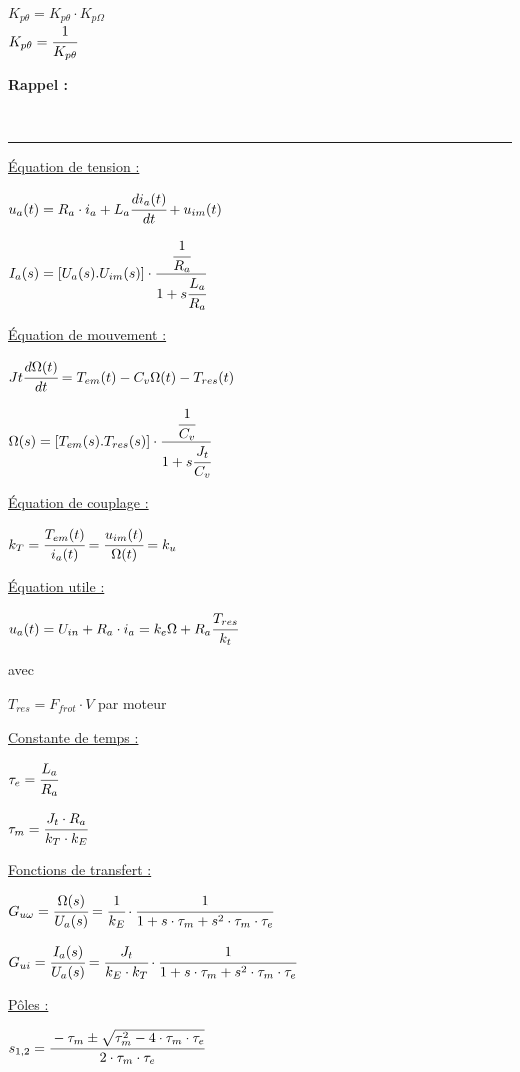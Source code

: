 \documentclass[	DIV=calc,%
							paper=a4,%
							fontsize=10pt,%
							twocolumn]{scrartcl} %
\newcounter{mycounter}
\newcommand{\formdesc}[1]{\large\textbf{#1} \addtocounter{mycounter}{1} \hfill \themycounter \\ \vspace{-3mm} \hrule \vspace{2mm}}
\newcommand{\formtitle}[1]{\large\underline{#1}}
\begin{document}
$K_{p\theta} =  K_{p\theta} \cdot K_{p\Omega}$\\


$K_{p\theta} =  \cfrac{1}{K_{p\theta}}$


\newpage

\formdesc{Rappel : }

\formtitle{Équation de tension : }

{\hfill $u_a(t) = R_a \cdot i_a + L_a \cfrac{di_a(t)}{dt}+u_{im}(t)$\hfill}

{\hfill $I_a(s) = [U_a(s).U_{im}(s)] \cdot \cfrac{ \cfrac{1}{R_a}}{1+s\cfrac{L_a}{R_a}}  $\hfill}


\formtitle{Équation de mouvement :} 

\vspace{3mm}

{\hfill $Jt \cfrac{d\Omega(t)}{dt} = T_{em}(t) - C_v \Omega(t) - T_{res}(t) $\hfill}

{\hfill $\Omega(s) = [T_{em}(s).T_{res}(s)] \cdot \cfrac{ \cfrac{1}{C_v}}{1+s\cfrac{J_t}{C_v}}  $\hfill}

\formtitle{Équation de couplage : }

{\hfill $k_T = \cfrac{T_{em}(t)}{i_a(t)} = \cfrac{u_{im}(t)}{\Omega(t) }= k_u$\hfill}

\formtitle{Équation utile : }

{\hfill $u_a(t) = U_{in} + R_a \cdot i_a  = k_e \Omega + R_a \cfrac{T_{res}}{k_t}$\hfill}

avec 

$T_{res} = F_{frot} \cdot V$ par moteur 

\formtitle{Constante de temps  : }

{\hfill $\tau_e = \cfrac{L_a}{R_a}$\hfill}


{\hfill $\tau_m = \cfrac{J_t\cdot R_a}{k_T\cdot k_E}$\hfill}

\formtitle{Fonctions de transfert : }

\vspace{3mm}

{\hfill $G_{u\omega} = \cfrac{\Omega(s)}{U_a(s)} = \cfrac{1}{k_E}\cdot\cfrac{1}{1 + s \cdot \tau_m + s^2 \cdot \tau_m \cdot \tau_e} $\hfill}

\vspace{3mm}
{\hfill $G_{ui} = \cfrac{I_a(s)}{U_a(s)} = \cfrac{J_t}{k_E\cdot k_T}\cdot\cfrac{1}{1 + s \cdot \tau_m + s^2 \cdot \tau_m \cdot \tau_e} $\hfill}

\formtitle{Pôles : }

{\hfill $s_{1,2} = \cfrac{-\tau_m \pm \sqrt{\tau_m^2 - 4 \cdot \tau_m \cdot \tau_e}}{2 \cdot \tau_m \cdot \tau_e} $\hfill}
\end{document}
